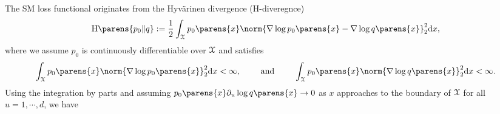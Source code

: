 The SM loss functional originates from the Hyv{\"a}rinen divergence (H-diveregnce) \parencite{Hyvarinen2005-wp}
\begin{align}
	\Hdiv \parens{p_0 \Vert q} := \frac{1}{2} \int_{\calX} p_0 \parens{x} \norm{\nabla \log p_0 \parens{x} - \nabla \log q \parens{x}}_2^2 \diff x, 
\end{align}
where we assume $p_0$ is continuously differentiable over $\mathcal{X}$ and satisfies 
\begin{align*}
	\int_{\calX} p_0 \parens{x} \norm{\nabla \log p_0 \parens{x}}_2^2 \diff x < \infty, \qquad \text{ and } \qquad \int_{\calX} p_0 \parens{x} \norm{\nabla \log q \parens{x}}_2^2 \diff x < \infty. 
\end{align*}
Using the integration by parts and assuming $p_0 \parens{x} \partial_u \log q \parens{x} \to 0$ as $x$ approaches to the boundary of $\mathcal{X}$ for all $u = 1, \cdots, d$, we have 

